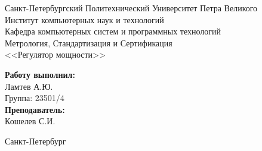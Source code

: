 \begin{titlepage}	%

	\begin{center}		%

		\normalsize Санкт-Петербургский Политехнический Университет Петра Великого\\
		\normalsize Институт компьютерных наук и технологий \\
		\normalsize Кафедра компьютерных систем и программных технологий\\[6cm]
		
		\Large Метрология, Стандартизация и Сертификация\\[0.5cm] %
		\normalsize <<Регулятор мощности>>\\[8.5cm]

	\end{center}


	\begin{flushright} %
		\begin{minipage}{0.30\textwidth} %
			\begin{flushleft} %

				\normalsize\textbf{Работу выполнил:}\\
				\normalsize Ламтев А.Ю.\\
				\normalsize {Группа:} 23501/4\\
				
				\normalsize \textbf{Преподаватель:}\\
				\normalsize Кошелев С.И.

			\end{flushleft}
		\end{minipage}
	\end{flushright}
	
	\vfill %

	\begin{center}
	\large Санкт-Петербург\\
	\large \the\year %
	\end{center} %

\thispagestyle{empty} %
\end{titlepage} %

\vfill %
